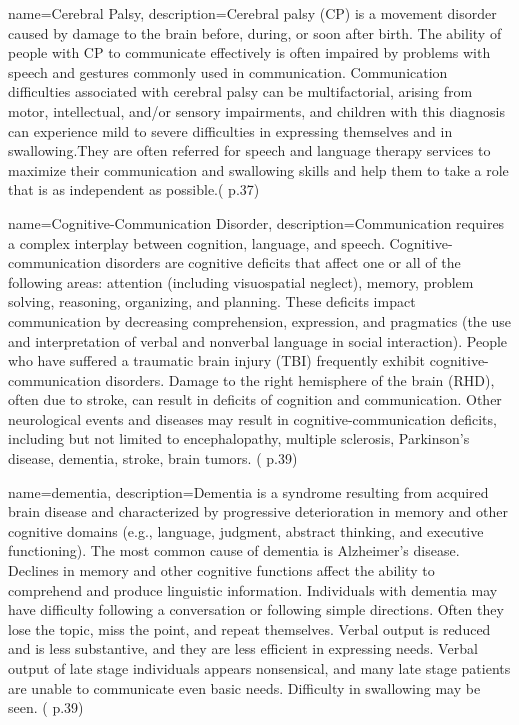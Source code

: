  {
	name={Cerebral Palsy}, 
	description={Cerebral palsy (CP) is a movement disorder caused by damage to the brain before, during, or soon after birth. The ability of people with CP to communicate effectively is often impaired by problems with speech and gestures commonly used in communication. Communication difficulties associated with cerebral palsy can be multifactorial, arising from motor, intellectual, and/or sensory impairments, and children with this diagnosis can experience mild to severe difficulties in expressing themselves and in swallowing.They are often referred for speech and language therapy services to maximize their communication and swallowing skills and help them to take a role that is as independent as possible.(\cite{SLPathologies} p.37)
}%
}


 {
	name={Cognitive-Communication Disorder}, 
	description={Communication requires a complex interplay between cognition, language, and speech. Cognitive-communication disorders are cognitive deficits that affect one or all of the following areas: attention (including visuospatial neglect), memory, problem solving, reasoning, organizing, and planning. These deficits impact communication by decreasing comprehension, expression, and pragmatics (the use and interpretation of verbal and nonverbal language in social interaction). People who have suffered a traumatic brain injury (TBI) frequently exhibit cognitive-communication disorders. Damage to the right hemisphere of the brain (RHD), often due to stroke, can result in deficits of cognition and communication. Other neurological events and diseases may result in cognitive-communication deficits, including but not limited to encephalopathy, multiple sclerosis, Parkinson’s disease, dementia, stroke, brain tumors. (\cite{SLPathologies} p.39)
}
}

 {
	name={dementia}, 
	description={Dementia is a syndrome resulting from acquired brain disease and characterized by progressive deterioration in memory and other cognitive domains (e.g., language, judgment, abstract thinking, and executive functioning). The most common cause of dementia is Alzheimer's disease. Declines in memory and other cognitive functions affect the ability to comprehend and produce linguistic information. Individuals with dementia may have difficulty following a conversation or following simple directions. Often they lose the topic, miss the point, and repeat themselves. Verbal output is reduced and is less substantive, and they are less efficient in expressing needs. Verbal output of late stage individuals appears nonsensical, and many late stage patients are unable to communicate even basic needs. Difficulty in swallowing may be seen. (\cite{SLPathologies} p.39)
}
}

